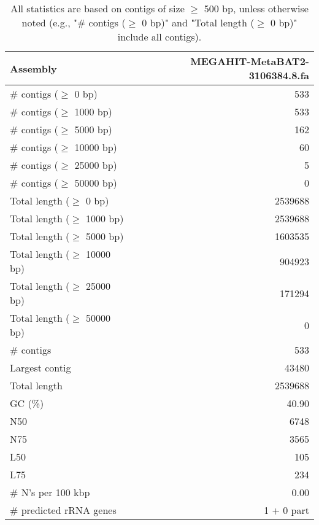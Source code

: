 \documentclass[12pt,a4paper]{article}
\begin{document}
\begin{table}[ht]
\begin{center}
\caption{All statistics are based on contigs of size $\geq$ 500 bp, unless otherwise noted (e.g., "\# contigs ($\geq$ 0 bp)" and "Total length ($\geq$ 0 bp)" include all contigs).}
\begin{tabular}{|l*{1}{|r}|}
\hline
Assembly & MEGAHIT-MetaBAT2-3106384.8.fa \\ \hline
\# contigs ($\geq$ 0 bp) & 533 \\ \hline
\# contigs ($\geq$ 1000 bp) & 533 \\ \hline
\# contigs ($\geq$ 5000 bp) & 162 \\ \hline
\# contigs ($\geq$ 10000 bp) & 60 \\ \hline
\# contigs ($\geq$ 25000 bp) & 5 \\ \hline
\# contigs ($\geq$ 50000 bp) & 0 \\ \hline
Total length ($\geq$ 0 bp) & 2539688 \\ \hline
Total length ($\geq$ 1000 bp) & 2539688 \\ \hline
Total length ($\geq$ 5000 bp) & 1603535 \\ \hline
Total length ($\geq$ 10000 bp) & 904923 \\ \hline
Total length ($\geq$ 25000 bp) & 171294 \\ \hline
Total length ($\geq$ 50000 bp) & 0 \\ \hline
\# contigs & 533 \\ \hline
Largest contig & 43480 \\ \hline
Total length & 2539688 \\ \hline
GC (\%) & 40.90 \\ \hline
N50 & 6748 \\ \hline
N75 & 3565 \\ \hline
L50 & 105 \\ \hline
L75 & 234 \\ \hline
\# N's per 100 kbp & 0.00 \\ \hline
\# predicted rRNA genes & 1 + 0 part \\ \hline
\end{tabular}
\end{center}
\end{table}
\end{document}
